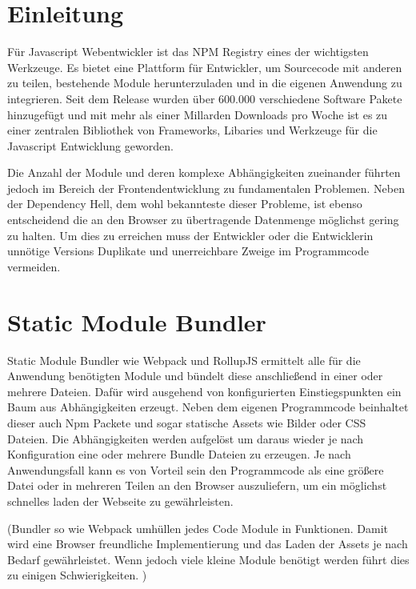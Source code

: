 \nocite{*}
\section{Einleitung}

Für Javascript Webentwickler ist das NPM Registry eines der wichtigsten Werkzeuge. Es bietet eine Plattform für Entwickler, um Sourcecode mit anderen zu teilen, bestehende Module herunterzuladen und in die eigenen Anwendung zu integrieren. Seit dem Release wurden über 600.000 verschiedene Software Pakete hinzugefügt und mit mehr als einer Millarden Downloads pro Woche ist es zu einer zentralen Bibliothek von Frameworks, Libaries und Werkzeuge für die Javascript Entwicklung geworden. \autocite{Npmdocs}

Die Anzahl der Module und deren komplexe Abhängigkeiten zueinander führten jedoch im Bereich der Frontendentwicklung zu fundamentalen Problemen. Neben der Dependency Hell, dem wohl bekannteste dieser Probleme, ist ebenso entscheidend die an den Browser zu übertragende Datenmenge möglichst gering zu halten. Um dies zu erreichen muss der Entwickler oder die Entwicklerin unnötige Versions Duplikate und unerreichbare Zweige im Programmcode vermeiden.\autocite{DominikWilkowski}

\section{Static Module Bundler}
Static Module Bundler wie Webpack und RollupJS ermittelt alle für die Anwendung benötigten Module und bündelt diese anschließend in einer oder mehrere Dateien. Dafür wird ausgehend von konfigurierten Einstiegspunkten ein Baum aus Abhängigkeiten erzeugt. Neben dem eigenen Programmcode beinhaltet dieser auch Npm Packete und sogar statische Assets wie Bilder oder CSS Dateien. Die Abhängigkeiten werden aufgelöst um daraus wieder je nach Konfiguration eine oder mehrere Bundle Dateien zu erzeugen. Je nach Anwendungsfall kann es von Vorteil sein den Programmcode als eine größere Datei oder in mehreren Teilen an den Browser auszuliefern, um ein möglichst schnelles laden der Webseite zu gewährleisten.
\autocite{RollupJSDocs,WebpackConcepts}

(Bundler so wie Webpack umhüllen jedes Code Module in Funktionen. Damit wird eine Browser freundliche Implementierung und das Laden der Assets je nach Bedarf gewährleistet. Wenn jedoch viele kleine Module benötigt werden führt dies zu einigen Schwierigkeiten. \autocite{RichHarris})

